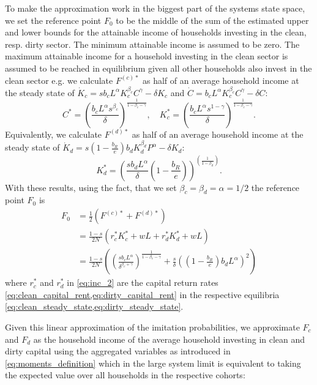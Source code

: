 To make the approximation work in the biggest part of the systems state space, we set the reference point $F_0$ to be the middle of the sum of the estimated upper and lower bounds for the attainable income of households investing in the clean, resp. dirty sector. The minimum attainable income is assumed to be zero. The maximum attainable income for a household investing in the clean sector is assumed to be reached in equilibrium given all other households also invest in the clean sector e.g. we calculate $F^{(c)*}$ as half of an average household income at the steady state of $\dot{K}_c = s b_c L^\alpha K_c^{\beta_c} C^\gamma - \delta K_c$ and $\dot{C} = b_c L^\alpha K_c^{\beta_c} C^\gamma - \delta C$:
\begin{equation}
	C^* = \left( \frac{b_c L^\alpha s^{\beta_c}}{\delta}\right)^{\frac{1}{1-\beta_c-\gamma}}, \quad K_c^* = \left( \frac{b_c L^\alpha s^{1-\gamma}}{\delta}\right)^{\frac{1}{1-\beta_c-\gamma}}.
	\label{eq:clean_steady_state}
\end{equation}
Equivalently, we calculate $F^{(d)*}$ as half of an average household income at the steady state of $ \dot{K}_d = s \left(1 - \frac{b_R}{e} \right) b_d K_d^{\beta_d} P^{\alpha} - \delta K_d $:
\begin{equation}
	K_d^* = \left( \frac{s b_d L^\alpha}{\delta} \left(1 - \frac{b_R}{e} \right)\right)^{\left(\frac{1}{1 - \beta_d} \right)}.
	\label{eq:dirty_steady_state}
\end{equation}
With these results, using the fact, that we set $\beta_c = \beta_d = \alpha = 1/2$ the reference point $F_0$ is
\begin{align}
	F_0 &= \frac{1}{2}\left(F^{(c)*} + F^{(d)*}  \right) \nonumber \\
	&= \frac{1-s}{2N}\left(r_c^* K_c^* + w L + r_d^* K_d^* + w L\right) \label{eq:inc_2}\\
	&= \frac{1-s}{2N}\left( \left( \frac{s b_c L^{\alpha}}{\delta^{\beta_c + \gamma}} \right)^{\frac{1}{1-\beta_c - \gamma}} + \frac{s}{\delta}\left( \left( 1 - \frac{b_R}{e} \right) b_d L^{\alpha} \right)^2 \right)
\end{align}
where $r_c^*$ and $r_d^*$ in \eqref{eq:inc_2} are the capital return rates \cref{eq:clean_capital_rent,eq:dirty_capital_rent} in the respective equilibria \cref{eq:clean_steady_state,eq:dirty_steady_state}.

Given this linear approximation of the imitation probabilities, we approximate $F_c$ and $F_d$ as the household income of the average household investing in clean and dirty capital using the aggregated variables as introduced in \eqref{eq:moments_definition} which in the large system limit is equivalent to taking the expected value over all households in the respective cohorts:

